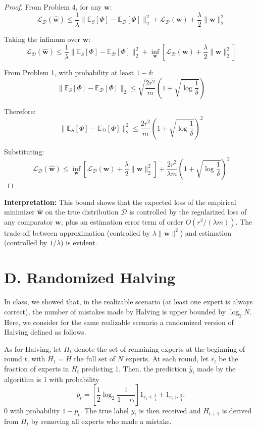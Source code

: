 \documentclass[letterpaper, 11pt]{article}
\newcommand{\1}{\mathds{1}}	%
\theoremstyle{definition}
\begin{document}
\begin{proof}
From Problem 4, for any $\mathbf{w}$:
$$\mathcal{L}_\mathcal{D}(\widehat{\mathbf{w}}) \leq \frac{1}{\lambda}\|\mathbb{E}_S[\Phi] - \mathbb{E}_\mathcal{D}[\Phi]\|_2^2 + \mathcal{L}_\mathcal{D}(\mathbf{w}) + \frac{\lambda}{2}\|\mathbf{w}\|_2^2$$

Taking the infimum over $\mathbf{w}$:
$$\mathcal{L}_\mathcal{D}(\widehat{\mathbf{w}}) \leq \frac{1}{\lambda}\|\mathbb{E}_S[\Phi] - \mathbb{E}_\mathcal{D}[\Phi]\|_2^2 + \inf_{\mathbf{w}}\left[\mathcal{L}_\mathcal{D}(\mathbf{w}) + \frac{\lambda}{2}\|\mathbf{w}\|_2^2\right]$$

From Problem 1, with probability at least $1-\delta$:
$$\|\mathbb{E}_S[\Phi] - \mathbb{E}_\mathcal{D}[\Phi]\|_2 \leq \sqrt{\frac{2r^2}{m}}\left(1 + \sqrt{\log\frac{1}{\delta}}\right)$$

Therefore:
$$\|\mathbb{E}_S[\Phi] - \mathbb{E}_\mathcal{D}[\Phi]\|_2^2 \leq \frac{2r^2}{m}\left(1 + \sqrt{\log\frac{1}{\delta}}\right)^2$$

Substituting:
$$\mathcal{L}_\mathcal{D}(\widehat{\mathbf{w}}) \leq \inf_{\mathbf{w}}\left[\mathcal{L}_\mathcal{D}(\mathbf{w}) + \frac{\lambda}{2}\|\mathbf{w}\|_2^2\right] + \frac{2r^2}{\lambda m}\left(1 + \sqrt{\log\frac{1}{\delta}}\right)^2$$
\end{proof}

\textbf{Interpretation:} This bound shows that the expected loss of the empirical minimizer $\widehat{\mathbf{w}}$ on the true distribution $\mathcal{D}$ is controlled by the regularized loss of any comparator $\mathbf{w}$, plus an estimation error term of order $O(r^2/(\lambda m))$. The trade-off between approximation (controlled by $\lambda\|\mathbf{w}\|^2$) and estimation (controlled by $1/\lambda$) is evident.


\section*{D. Randomized Halving}

In class, we showed that, in the realizable scenario (at least one expert is always correct), the number of mistakes made by Halving is upper bounded by $\log_2 N$. Here, we consider for the same realizable scenario a randomized version of Halving defined as follows.

As for Halving, let $H_t$ denote the set of remaining experts at the beginning of round $t$, with $H_1 = H$ the full set of $N$ experts. At each round, let $r_t$ be the fraction of experts in $H_t$ predicting 1. Then, the prediction $\widehat{y}_t$ made by the algorithm is 1 with probability
\[
p_t = \left[ \frac{1}{2} \log_2 \frac{1}{1-r_t} \right] 1_{r_t \leq \frac{3}{4}} + 1_{r_t > \frac{3}{4}},
\]
0 with probability $1 - p_t$. The true label $y_t$ is then received and $H_{t+1}$ is derived from $H_t$ by removing all experts who made a mistake.
\end{document}

